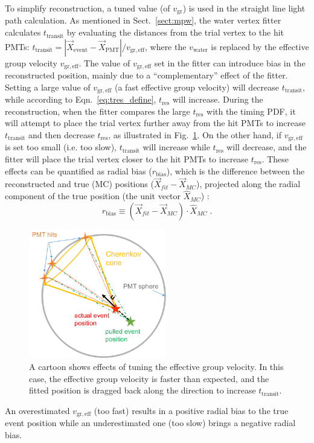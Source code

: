 To simplify reconstruction, a tuned value (of $v_\mathrm{gr}$) is used in the straight line light path calculation. As mentioned in Sect.~\ref{sect:mpw}, the water vertex fitter calculates $t_\mathrm{transit}$ by evaluating the distances from the trial vertex to the hit PMTs: $t_\mathrm{transit}=|\vec{X}_\mathrm{event}-\vec{X}_\mathrm{PMT}|/v_\mathrm{gr,eff}$, where the $v_\mathrm{water}$ is replaced by the effective group velocity $v_\mathrm{gr,eff}$. The value of $v_\mathrm{gr,eff}$ set in the fitter can introduce bias in the reconstructed position, mainly due to a ``complementary'' effect of the fitter. Setting a large value of $v_\mathrm{gr,eff}$ (a fast effective group velocity) will decrease $t_\mathrm{transit}$, while according to Eqn.~\ref{eq:tres_define}, $t_\mathrm{res}$ will increase. During the reconstruction, when the fitter compares the large $t_\mathrm{res}$ with the timing PDF, it will attempt to place the trial vertex further away from the hit PMTs to increase $t_\mathrm{transit}$ and then decrease $t_\mathrm{res}$, as illustrated in Fig.~\ref{fig:effectiveVg}. On the other hand, if $v_\mathrm{gr,eff}$ is set too small (i.e. too slow), $t_\mathrm{transit}$ will increase while $t_\mathrm{res}$ will decrease, and the fitter will place the trial vertex closer to the hit PMTs to increase $t_\mathrm{res}$. These effects can be quantified as radial bias ($r_\mathrm{bias}$), which is the difference between the reconstructed and true (MC) positions ($\vec{X}_{fit}-\vec{X}_{MC}$), projected along the radial component of the true position (the unit vector $\hat{X}_{MC}$) \cite{coulter2013modelling}:
\begin{equation}
r_\mathrm{bias} \equiv (\vec{X}_{fit}-\vec{X}_{MC})\cdot \hat{X}_{MC}\;.
\end{equation}

\begin{figure}[!htb]
	\centering
	\includegraphics[width=6cm]{effectOfGroupVelocity.png}
	\caption[A cartoon shows effects of tuning the effective group velocity.]{A cartoon shows effects of tuning the effective group velocity. In this case, the effective group velocity is faster than expected, and the fitted position is dragged back along the direction to increase $t_\mathrm{transit}$.\label{fig:effectiveVg}}
\end{figure}
An overestimated $v_\mathrm{gr,eff}$ (too fast) results in a positive radial bias to the true event position while an underestimated one (too slow) brings a negative radial bias.

